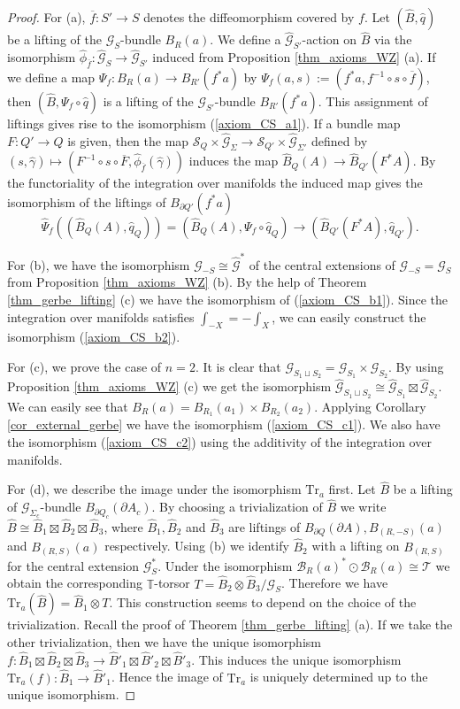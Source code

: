 \documentclass[a4paper,a4paper]{article}
\theoremstyle{definition}
\theoremstyle{remark}
\newcommand{\T}{\mathbb{T}}
\newcommand{\B}{\mathcal{B}}
\newcommand{\G}{\mathcal{G}}
\newcommand{\sT}{\mathcal{T}}
\newcommand{\Tr}{\mathrm{Tr}}
\newcommand{\hq}{\widehat{q}}
\renewcommand{\S}{\mathcal{S}}
\def\h#1{ \widehat{#1} }
\begin{document}
\begin{proof}
For (a), $\overline{f} : S' \to S$ denotes the diffeomorphism covered by $f$. Let $(\h{B}, \hq)$ be a lifting of the $\G_S$-bundle $B_R(a)$. We define a $\h{\G}_{S'}$-action on $\h{B}$ via the isomorphism $\h{\phi}_{\overline{f}} : \h{\G}_S \to \h{\G}_{S'}$ induced from Proposition \ref{thm_axioms_WZ} (a). If we define a map $\Psi_f : B_R(a) \to B_{R'}(f^*a)$ by $\Psi_f(a, s) := (f^*a, f^{-1} \circ s \circ \overline{f})$, then $(\h{B}, \Psi_f \circ \hq)$ is a lifting of the $\G_{S'}$-bundle $B_{R'}(f^*a)$. This assignment of liftings gives rise to the isomorphism (\ref{axiom_CS_a1}). If a bundle map $F : Q' \to Q$ is given, then the map $\S_Q \times \h{\G}_{\Sigma} \to \S_{Q'} \times \h{\G}_{\Sigma'}$ defined by $(s, \h{\gamma}) \mapsto (F^{-1} \circ s \circ \overline{F}, \h{\phi}_{\overline{f}}(\h{\gamma}))$ induces the map $\h{B}_Q(A) \to \h{B}_{Q'}(F^*A)$. By the functoriality of the integration over manifolds the induced map gives the isomorphism of the liftings of $B_{\partial Q'}(f^* a)$
$$
\h{\Psi}_f \left( (\h{B}_Q(A), \hq_Q) \right) = 
(\h{B}_Q(A), \Psi_f \circ \hq_Q) \longrightarrow
(\h{B}_{Q'}(F^*A), \hq_{Q'}) .
$$

For (b), we have the isomorphism $\h{\G}_{-S} \cong \h{\G}^*$ of the central extensions of $\G_{-S} = \G_{S}$ from Proposition \ref{thm_axioms_WZ} (b). By the help of Theorem \ref{thm_gerbe_lifting} (c) we have the isomorphism of (\ref{axiom_CS_b1}). Since the integration over manifolds satisfies $\int_{-X} = -\int_X$, we can easily construct the isomorphism (\ref{axiom_CS_b2}).

For (c), we prove the case of $n = 2$. It is clear that $\G_{S_1 \sqcup S_2} = \G_{S_1} \times \G_{S_2}$. By using Proposition \ref{thm_axioms_WZ} (c) we get the isomorphism $\h{\G}_{S_1 \sqcup S_2} \cong \h{\G}_{S_1} \boxtimes \h{\G}_{S_2}$. We can easily see that $B_R(a) = B_{R_1}(a_1) \times B_{R_2}(a_2)$. Applying Corollary \ref{cor_external_gerbe} we have the isomorphism (\ref{axiom_CS_c1}). We also have the isomorphism (\ref{axiom_CS_c2}) using the additivity of the integration over manifolds.

For (d), we describe the image under the isomorphism $\Tr_a$ first. Let $\h{B}$ be a lifting of $\G_{\Sigma_c}$-bundle $B_{\partial Q_c}(\partial A_c)$. By choosing a trivialization of $\h{B}$ we write $\h{B} \cong \h{B}_1 \boxtimes \h{B}_2 \boxtimes \h{B}_3$, where $\h{B}_1, \h{B}_2$ and $\h{B}_3$ are liftings of $B_{\partial Q}(\partial A), B_{(R, -S)}(a)$ and $B_{(R, S)}(a)$ respectively. Using (b) we identify $\h{B}_2$ with a lifting on $B_{(R, S)}$ for the central extension $\G_S^*$. Under the isomorphism $\B_R(a)^* \odot \B_R(a) \cong \sT$ we obtain the corresponding $\T$-torsor $T = \h{B}_2 \otimes \h{B}_3 / \G_S$. Therefore we have $\Tr_a(\h{B}) = \h{B}_1 \otimes T$. This construction seems to depend on the choice of the trivialization. Recall the proof of Theorem \ref{thm_gerbe_lifting} (a). If we take the other trivialization, then we have the unique isomorphism $f : \h{B}_1 \boxtimes \h{B}_2 \boxtimes \h{B}_3 \to \h{B}'_1 \boxtimes \h{B}'_2 \boxtimes \h{B}'_3$. This induces the unique isomorphism $\Tr_a(f) : \h{B}_1 \to \h{B}'_1$. Hence the image of $\Tr_a$ is uniquely determined up to the unique isomorphism.


\end{proof}
\end{document}
